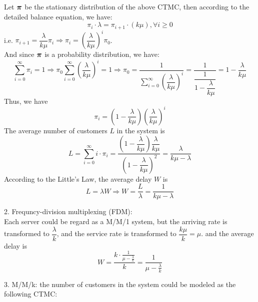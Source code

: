 \begin{homeworkProblem}
\begin{center}
\end{center}

Let $\boldsymbol{\pi}$ be the stationary distribution of the above CTMC, then according to the detailed balance equation, we have:
$$\pi_i\cdot\lambda = \pi_{i+1}\cdot(k\mu), \forall i\geq 0$$
i.e. $\pi_{i+1} = \dfrac{\lambda}{k\mu}\pi_i\Rightarrow \pi_i = \left(\dfrac{\lambda}{k\mu}\right)^i\pi_0$. \\
And since $\boldsymbol{\pi}$ is a probability distribution, we have:
$$\sum_{i=0}^{\infty}\pi_i = 1\Rightarrow \pi_0\sum_{i=0}^{\infty}\left(\dfrac{\lambda}{k\mu}\right)^i = 1\Rightarrow \pi_0 = \dfrac{1}{\sum\limits_{i=0}^{\infty}\left(\dfrac{\lambda}{k\mu}\right)^i} = \dfrac{1}{\dfrac{1}{1-\dfrac{\lambda}{k\mu}}}=1-\dfrac{\lambda}{k\mu}$$
Thus, we have
$$\pi_i=\left(1-\dfrac{\lambda}{k\mu}\right)\left(\dfrac{\lambda}{k\mu}\right)^i$$
The average number of customers $L$ in the system is
$$L=\sum_{i=0}^{\infty}i\cdot\pi_i = \dfrac{\left(1-\dfrac{\lambda}{k\mu}\right)\dfrac{\lambda}{k\mu}}{\left(1-\dfrac{\lambda}{k\mu}\right)^2}=\dfrac{\lambda}{k\mu-\lambda}$$
According to the Little's Law, the average delay $W$ is
$$L=\lambda W\Rightarrow W=\dfrac{L}{\lambda}=\dfrac{1}{k\mu-\lambda}$$

2. Frequncy-division multiplexing (FDM): \\
Each server could be regard as a M/M/1 system, but the arriving rate is transformed to $\dfrac{\lambda}{k}$, and the service rate is transformed to $\dfrac{k\mu}{k}=\mu$.  and the average delay is
$$W=\dfrac{k\cdot \frac{1}{\mu-\frac{\lambda}{k}}}{k}=\dfrac{1}{\mu-\frac{\lambda}{k}}$$

3. M/M/k: the number of customers in the system could be modeled as the following CTMC:
\begin{center}
\end{center}
\end{homeworkProblem}
